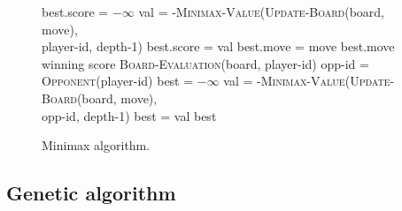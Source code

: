 \documentclass[a4paper,11pt]{article}
\begin{document}
\begin{figure}
\begin{algorithmic}
  \State best.score = $-\infty$
    \State val = -\textsc{Minimax-Value}(\textsc{Update-Board}(board, move), \\
    \hspace{160pt} player-id, depth-1)
      \State best.score = val
      \State best.move = move
    \EndIf
  \EndFor
  \State \Return best.move
\EndFunction
\\
  \State \Return winning score
  \State \Return \textsc{Board-Evaluation}(board, player-id)
\Else
  \State opp-id = \textsc{Opponent}(player-id)
  \State best = $-\infty$
    \State val = -\textsc{Minimax-Value}(\textsc{Update-Board}(board, move), \\
    \hspace{180pt} opp-id, depth-1)
      \State best = val
    \EndIf
  \EndFor
  \State \Return best
\EndIf
\EndFunction
\end{algorithmic}
\caption{Minimax algorithm.}
\end{figure}




\subsection{Genetic algorithm}
\label{genetic}
\end{document}
